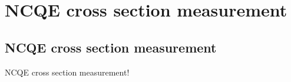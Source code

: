 
%
%

\section{NCQE cross section measurement}\label{Section_NCQE}

\subsection{NCQE cross section measurement}
\vs\hs NCQE cross section measurement!

\newpage
